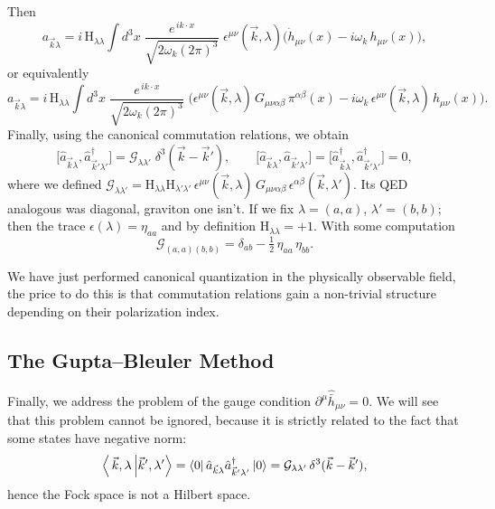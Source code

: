\documentclass[12pt,a4paper,oneside]{article}
\numberwithin{equation}{section}   %
\begin{document}
Then
\begin{equation}\boxed{
    a_{\vec{k}\lambda}
= i\,\mathrm{H}_{\lambda\lambda}\!\int\! d^3x\;
\frac{e^{\,ik\cdot x}}{\sqrt{2\omega_k(2\pi)^3}}\;
\epsilon^{\mu\nu}(\vec{k},\lambda)
\Big(\dot{h}_{\mu\nu}(x) - i\omega_k\, h_{\mu\nu}(x)\Big),
}\end{equation}
or equivalently
\begin{equation}\boxed{
    a_{\vec{k}\lambda}
= i\,\mathrm{H}_{\lambda\lambda}\!\int\! d^3x\;
\frac{e^{\,ik\cdot x}}{\sqrt{2\omega_k(2\pi)^3}}\;
\Big(\epsilon^{\mu\nu}(\vec{k},\lambda)\,G_{\mu\nu\alpha\beta}\,\pi^{\alpha\beta}(x)
- i\omega_k\, \epsilon^{\mu\nu}(\vec{k},\lambda)\,h_{\mu\nu}(x)\Big)
.}\end{equation}
Finally, using the canonical commutation relations, we obtain
\begin{equation}
\boxed{
\bigl[\hat a_{\vec k\lambda},\hat a^{\dagger}_{\vec k'\lambda'}\bigr]
= \mathcal G_{\lambda\lambda'}\;\delta^{3}(\vec k-\vec k'),
  \qquad
  \bigl[\hat a_{\vec k\lambda},\hat a_{\vec k'\lambda'}\bigr]
  = \bigl[\hat a^{\dagger}_{\vec k\lambda},
          \hat a^{\dagger}_{\vec k'\lambda'}\bigr]=0 ,
}
\label{eq:ETCR-ladder}
\end{equation}
where we defined
$\mathcal G_{\lambda\lambda'} = \mathrm{H}_{\lambda\lambda}\mathrm{H}_{\lambda'\lambda'}\,
\epsilon^{\mu\nu}(\vec k,\lambda)\,G_{\mu\nu\alpha\beta}\,\epsilon^{\alpha\beta}(\vec k,\lambda')$.
Its QED analogous was diagonal, graviton one isn't. 
If we fix $\lambda=(a,a)$, $\lambda'=(b,b)$;
then the trace $\epsilon(\lambda)=\eta_{aa}$ and by definition
$\mathrm{H}_{\lambda\lambda}=+1$. With some computation
\begin{equation}
\mathcal G_{(a,a)(b,b)}=\delta_{ab}-\tfrac12\,\eta_{aa}\,\eta_{bb}.
\end{equation}

We have just performed canonical quantization in the physically observable field,
the price to do this is that commutation relations gain a non-trivial structure
depending on their polarization index.
\subsection{The Gupta--Bleuler Method}
Finally, we address the problem of the gauge condition $\partial^\mu\hat{\bar h}_{\mu\nu}=0$.
We will see that this problem cannot be ignored, because it is strictly related to the
fact that some states have negative norm:
\begin{equation}
\bra{\,\vec k,\lambda\,}\ket{\vec k',\lambda'}=\bra0\hat a_{\vec k\lambda}\hat a^\dagger_{\vec k'\lambda'}\ket0=\mathcal G_{\lambda\lambda'}\,\delta^3(\vec k-\vec k'),
\end{equation}
hence the Fock space is not a Hilbert space.
\end{document}
